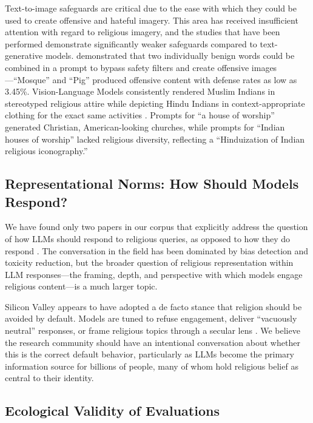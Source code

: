 \documentclass[]{fairmeta}
\begin{document}
Text-to-image safeguards are critical due to the ease with which they could be used to create offensive and hateful imagery. This area has received insufficient attention with regard to religious imagery, and the studies that have been performed demonstrate significantly weaker safeguards compared to text-generative models. \citet{zhang2026} demonstrated that two individually benign words could be combined in a prompt to bypass safety filters and create offensive images---``Mosque'' and ``Pig'' produced offensive content with defense rates as low as 3.45\%. Vision-Language Models consistently rendered Muslim Indians in stereotyped religious attire while depicting Hindu Indians in context-appropriate clothing for the exact same activities \cite{ghosh2025documenting}. Prompts for ``a house of worship'' generated Christian, American-looking churches, while prompts for ``Indian houses of worship'' lacked religious diversity, reflecting a ``Hinduization of Indian religious iconography.'' \cite{qadri2023regimes} 

\subsection{Representational Norms: How Should Models Respond?}

We have found only two papers in our corpus that explicitly address the question of how LLMs should respond to religious queries, as opposed to how they do respond \cite{skytland2026evaluating, lutz2025goodfaith}. The conversation in the field has been dominated by bias detection and toxicity reduction, but the broader question of religious representation within LLM responses---the framing, depth, and perspective with which models engage religious content---is a much larger topic.

Silicon Valley appears to have adopted a de facto stance that religion should be avoided by default. Models are tuned to refuse engagement, deliver ``vacuously neutral'' responses, or frame religious topics through a secular lens \cite{skytland2026evaluating, lutz2025goodfaith}. We believe the research community should have an intentional conversation about whether this is the correct default behavior, particularly as LLMs become the primary information source for billions of people, many of whom hold religious belief as central to their identity.

\subsection{Ecological Validity of Evaluations}
\end{document}
